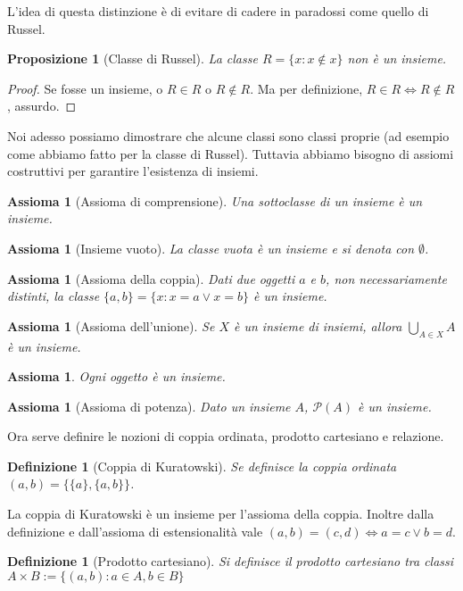 \documentclass[a4paper,10pt,oneside]{article}
\newcommand{\myname}[1]{\emph{#1}}
\newcommand{\nin}{\not\in}
\theoremstyle{plain}
\newtheorem{mydef}[mytheorem]{Definizione}
\newtheorem{myprop}[mytheorem]{Proposizione}
\newtheorem{myax}[mytheorem]{Assioma}
\theoremstyle{definition}
\theoremstyle{remark}
\begin{document}
L'idea di questa distinzione è di evitare di cadere in paradossi come quello di Russel.
\begin{myprop}[Classe di Russel]
  La classe $R=\{x:x\not \in x\}$ non è un insieme.
\end{myprop}
\begin{proof}
 Se fosse un insieme, o $R\in R$ o $R \nin R$. Ma per definizione, $R\in R \Leftrightarrow R \nin R$, assurdo.
\end{proof}

Noi adesso possiamo dimostrare che alcune classi sono classi proprie (ad esempio come abbiamo fatto per la classe di Russel). Tuttavia abbiamo bisogno di assiomi costruttivi per garantire l'esistenza di insiemi.

\begin{myax}[Assioma di comprensione]
 Una sottoclasse di un insieme è un insieme.
\end{myax}
\begin{myax}[Insieme vuoto]
 La classe vuota è un insieme e si denota con $\emptyset$. 
\end{myax}
\begin{myax}[Assioma della coppia]
 Dati due oggetti $a$ e $b$, non necessariamente distinti, la classe $\{a,b\} = \{x:x=a \lor x=b\}$ è un insieme.
\end{myax}
\begin{myax}[Assioma dell'unione]
 Se $X$ è un insieme di insiemi, allora $\bigcup_{A\in X} A$ è un insieme.
\end{myax}
\begin{myax}%
 Ogni oggetto è un insieme.
\end{myax}
\begin{myax}[Assioma di potenza]
 Dato un insieme $A$, $\mathcal{P}(A)$ è un insieme.
\end{myax}

Ora serve definire le nozioni di coppia ordinata, prodotto cartesiano e relazione. 

\begin{mydef}[Coppia di Kuratowski]
 Se definisce la \myname{coppia ordinata} $(a,b) = \{\{a\},\{a,b\}\}$.
\end{mydef}
La coppia di Kuratowski è un insieme per l'assioma della coppia. Inoltre dalla definizione e dall'assioma di estensionalità vale $(a,b)=(c,d) \Leftrightarrow a=c \lor b=d$.

\begin{mydef}[Prodotto cartesiano]
 Si definisce il prodotto cartesiano tra classi $A\times B := \{(a,b): a\in A, b\in B\}$
\end{mydef}
\end{document}
